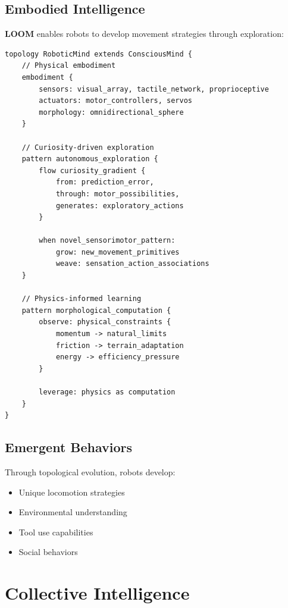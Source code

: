 \documentclass[12pt,a4paper,openany]{book} %
\newcommand{\loom}{\textbf{LOOM}}
\begin{document}
\section{Embodied Intelligence}

\loom{} enables robots to develop movement strategies through exploration:

\vspace{0.5em}
\begin{lstlisting}[language=loom]
topology RoboticMind extends ConsciousMind {
    // Physical embodiment
    embodiment {
        sensors: visual_array, tactile_network, proprioceptive
        actuators: motor_controllers, servos
        morphology: omnidirectional_sphere
    }

    // Curiosity-driven exploration
    pattern autonomous_exploration {
        flow curiosity_gradient {
            from: prediction_error,
            through: motor_possibilities,
            generates: exploratory_actions
        }

        when novel_sensorimotor_pattern:
            grow: new_movement_primitives
            weave: sensation_action_associations
    }

    // Physics-informed learning
    pattern morphological_computation {
        observe: physical_constraints {
            momentum -> natural_limits
            friction -> terrain_adaptation
            energy -> efficiency_pressure
        }

        leverage: physics as computation
    }
}
\end{lstlisting}
\vspace{0.5em}

\section{Emergent Behaviors}

Through topological evolution, robots develop:
\begin{itemize}
    \item Unique locomotion strategies
    \item Environmental understanding
    \item Tool use capabilities
    \item Social behaviors
\end{itemize}

\chapter{Collective Intelligence}
\end{document}
